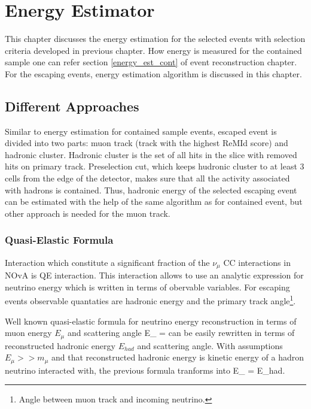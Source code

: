 \chapter{Energy Estimator}
\label{energy_estimator_chapter}

This chapter discusses the energy estimation for the selected events with selection
criteria developed in previous chapter. How energy is measured for the contained 
sample one can refer section \ref{energy_est_cont} of event reconstruction chapter.
For the escaping events, energy estimation algorithm is discussed in this chapter.

\section{Different Approaches}
Similar to energy estimation for contained sample events, escaped event is divided
into two parts: muon track (track with the highest ReMId score) and hadronic cluster.
Hadronic cluster is the set of all hits in the slice with removed hits on primary 
track. Preselection cut, which keeps hudronic cluster to at least 3 cells from
the edge of the detector, makes sure that all the activity associated with hadrons is
contained. Thus, hadronic energy of the selected escaping event can be estimated
with the help of the same algorithm as for contained event, but other approach is needed
for the muon track.

\subsection{Quasi-Elastic Formula}
Interaction which constitute a significant fraction of the $\nu_\mu$ CC interactions 
in NOvA is QE interaction. This interaction allows to use an analytic expression for
neutrino energy which is written in terms of obervable variables. For escaping events
observable quantaties are hadronic energy and the primary track angle\footnote{Angle
between muon track and incoming neutrino.}. 

Well known quasi-elastic formula for neutrino energy reconstruction in terms of muon
energy $E_\mu$ and scattering angle %
\be
E_{\nu} = 
\ee
can be easily rewritten in terms of reconstructed hadronic energy $E_{had}$ and 
scattering angle. With assumptions $E_\mu >> m_\mu$ and that reconstructed hadronic 
energy is kinetic energy of a hadron neutrino interacted with, the previous formula 
tranforms into
\be
E_{\nu} = E_{had}.
\ee

